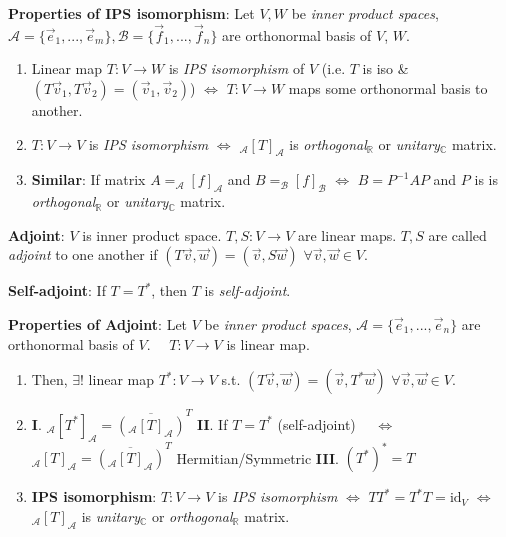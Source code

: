 \documentclass[9pt]{article}
\begin{document}
\textbf{Properties of IPS isomorphism}: {\small Let $V,W$ be \textit{inner product spaces}, $\mathcal{A}=\{\vec{e}_1,...,\vec{e}_m\},\mathcal{B}=\{\vec{f}_1,...,\vec{f}_n\}$ are orthonormal basis of $V$, $W$.}

\begin{enumerate}[itemsep=-2pt, topsep=-2pt]
    \item {\small {\scriptsize Linear map} $T:V\to W$ is \textit{IPS isomorphism} of $V$ {\tiny (i.e. $T$ is iso \& $(T\vec{v}_1,T\vec{v}_2)=(\vec{v}_1,\vec{v}_2)$)} \quad $\Leftrightarrow$  $T:V\to W$ maps some orthonormal basis to another.}
    \item $T:V\to V$ is \textit{IPS isomorphism} \quad $\Leftrightarrow$ \quad $_{\mathcal{A}}[T]_{\mathcal{A}}$ is \textit{orthogonal}$_{\mathbb{R}}$ or \textit{unitary}$_{\mathbb{C}}$ matrix.
    \item \textbf{Similar}: If matrix $A=_{\mathcal{A}}[f]_{\mathcal{A}}$ and $B=_{\mathcal{B}}[f]_{\mathcal{B}}$ \quad $\Leftrightarrow$ \quad $B=P^{-1}AP$ and $P$ is is \textit{orthogonal}$_{\mathbb{R}}$ or \textit{unitary}$_{\mathbb{C}}$ matrix.
\end{enumerate}

\textbf{Adjoint}: {\small {\scriptsize $V$ is inner product space. $T,S:V\to V$ are linear maps.} \qquad $T,S$ are called \textit{adjoint} to one another if $(T\vec{v},\vec{w})=(\vec{v},S\vec{w})$ \quad $\forall \vec{v},\vec{w}\in V$.}

\textbf{Self-adjoint}: If $T=T^*$, then $T$ is \textit{self-adjoint}. 

\textbf{Properties of Adjoint}: Let $V$ be \textit{inner product spaces}, $\mathcal{A}=\{\vec{e}_1,...,\vec{e}_n\}$ are orthonormal basis of $V$. \ \ $T:V\to V$ is linear map.

\begin{enumerate}[itemsep=-2pt, topsep=-2pt]
    \item Then, $\exists!$ linear map $T^*:V\to V$ s.t. $(T\vec{v},\vec{w})=(\vec{v},T^*\vec{w})$ \quad $\forall \vec{v},\vec{w}\in V$.
    \item \textbf{I}. $_{\mathcal{A}}[T^*]_{\mathcal{A}}=\overline{(_{\mathcal{A}}[T]_{\mathcal{A}})}^T$ \qquad \textbf{II}. If $T=T^*$ {\scriptsize (self-adjoint)} \ \ $\Leftrightarrow$ \ \ $_{\mathcal{A}}[T]_{\mathcal{A}}=\overline{(_{\mathcal{A}}[T]_{\mathcal{A}})}^T$ {\scriptsize Hermitian/Symmetric} \qquad \textbf{III}. $(T^*)^*=T$
    \item \textbf{IPS isomorphism}: $T:V\to V$ is \textit{IPS isomorphism} \quad $\Leftrightarrow$ \quad $TT^*=T^*T=\text{id}_V$ \quad $\Leftrightarrow$ \quad $_{\mathcal{A}}[T]_{\mathcal{A}}$ is \textit{unitary}$_{\mathbb{C}}$ or \textit{orthogonal}$_{\mathbb{R}}$ matrix.
\end{enumerate}
\end{document}
